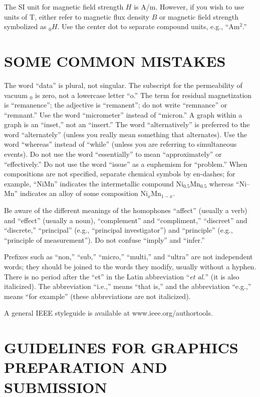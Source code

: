 \documentclass{IEEEoj}
\begin{document}
The SI unit for magnetic field strength $H$ is A/m. However, if you wish to use 
units of T, either refer to magnetic flux density $B$ or magnetic field 
strength symbolized as \textmu $_{0}H$. Use the center dot to separate 
compound units, e.g., ``A\textbullet m$^{2}$.''

\section{SOME COMMON MISTAKES}
The word ``data'' is plural, not singular. The subscript for the 
permeability of vacuum \textmu $_{0}$ is zero, not a lowercase letter ``o.'' 
The term for residual magnetization is ``remanence''; the adjective is 
``remanent''; do not write ``remnance'' or ``remnant.'' Use the word 
``micrometer'' instead of ``micron.'' A graph within a graph is an 
``inset,'' not an ``insert.'' The word ``alternatively'' is preferred to the 
word ``alternately'' (unless you really mean something that alternates). Use 
the word ``whereas'' instead of ``while'' (unless you are referring to 
simultaneous events). Do not use the word ``essentially'' to mean 
``approximately'' or ``effectively.'' Do not use the word ``issue'' as a 
euphemism for ``problem.'' When compositions are not specified, separate 
chemical symbols by en-dashes; for example, ``NiMn'' indicates the 
intermetallic compound Ni$_{0.5}$Mn$_{0.5}$ whereas ``Ni--Mn'' indicates an 
alloy of some composition Ni$_{x}$Mn$_{1-x}$.

Be aware of the different meanings of the homophones ``affect'' (usually a 
verb) and ``effect'' (usually a noun), ``complement'' and ``compliment,'' 
``discreet'' and ``discrete,'' 
``principal'' (e.g., ``principal investigator'') and ``principle'' 
(e.g., ``principle of measurement''). Do not confuse ``imply'' and 
``infer.'' 

Prefixes such as ``non,'' ``sub,'' ``micro,'' ``multi,'' and ``ultra'' are 
not independent words; they should be joined to the words they modify, 
usually without a hyphen. There is no period after the ``et'' in the Latin 
abbreviation ``\textit{et al.}'' (it is also italicized). The abbreviation ``i.e.,'' means 
``that is,'' and the abbreviation ``e.g.,'' means ``for example'' (these 
abbreviations are not italicized).

A general IEEE styleguide is available at www.ieee.org/\break authortools.

\section{GUIDELINES FOR GRAPHICS PREPARATION 
AND SUBMISSION}
\end{document}
